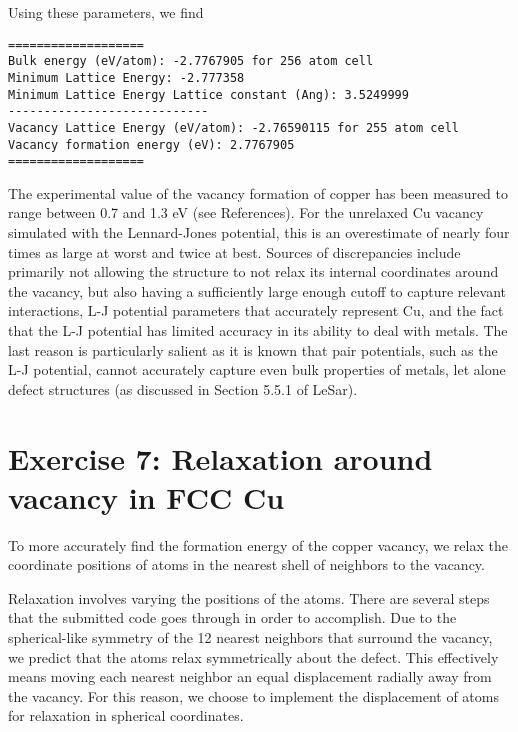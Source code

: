 \documentclass[12pt, oneside]{article}
\begin{document}
Using these parameters, we find

\begin{verbatim}
===================
Bulk energy (eV/atom): -2.7767905 for 256 atom cell
Minimum Lattice Energy: -2.777358
Minimum Lattice Energy Lattice constant (Ang): 3.5249999
----------------------------
Vacancy Lattice Energy (eV/atom): -2.76590115 for 255 atom cell
Vacancy formation energy (eV): 2.7767905
===================
\end{verbatim}

The experimental value of the vacancy formation of copper has been measured to range between 0.7 and 1.3 eV (see References). 
For the unrelaxed Cu vacancy simulated with the Lennard-Jones potential, this is an overestimate of nearly four times as large at worst and twice at best.
Sources of discrepancies include primarily not allowing the structure to not relax its internal coordinates around the vacancy, but also having a sufficiently large enough cutoff to capture relevant interactions, L-J potential parameters that accurately represent Cu, and the fact that the L-J potential has limited accuracy in its ability to deal with metals. The last reason is particularly salient as it is known that pair potentials, such as the L-J potential, cannot accurately capture even bulk properties of metals, let alone defect structures (as discussed in Section 5.5.1 of LeSar). 

\section{Exercise 7: Relaxation around vacancy in FCC Cu}

To more accurately find the formation energy of the copper vacancy, we relax the coordinate positions of atoms in the nearest shell of neighbors to the vacancy. 

Relaxation involves varying the positions of the atoms. There are several steps that the submitted code goes through in order to accomplish. Due to the spherical-like symmetry of the 12 nearest neighbors that surround the vacancy, we predict that the atoms relax symmetrically about the defect. This effectively means moving each nearest neighbor an equal displacement radially away from the vacancy. For this reason, we choose to implement the displacement of atoms for relaxation in spherical coordinates.
\end{document}
